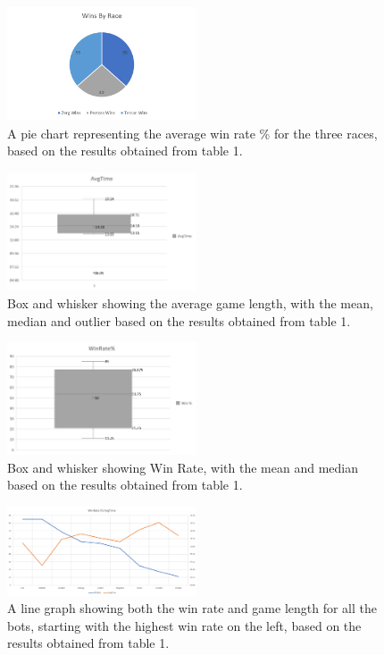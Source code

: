 \documentclass[journal]{IEEEtran}
\begin{document}
\begin{figure}[H]
	\centering
	\includegraphics[width=0.5\textwidth]{RacePie}
	\caption{A pie chart representing the average win rate \% for the three races, based on the results obtained from table 1.}
	\label{Fig4}
\end{figure}
\begin{figure}[H]
	\centering
	\includegraphics[width=0.5\textwidth]{AvgTimeBar}
	\caption{Box and whisker showing the average game length, with the mean, median and outlier based on the results obtained from table 1.}
	\label{Fig5}
\end{figure}
\begin{figure}[H]
	\centering
	\includegraphics[width=0.5\textwidth]{WinBar}
	\caption{Box and whisker showing Win Rate, with the mean and median based on the results obtained from table 1.}
	\label{Fig6}
\end{figure}
\begin{figure}[H]
	\centering
	\includegraphics[width=0.5\textwidth]{WinTimeLine}
	\caption{A line graph showing both the win rate and game length for all the bots, starting with the highest win rate on the left, based on the results obtained from table 1.}
	\label{Fig7}
\end{figure}
\end{document}

